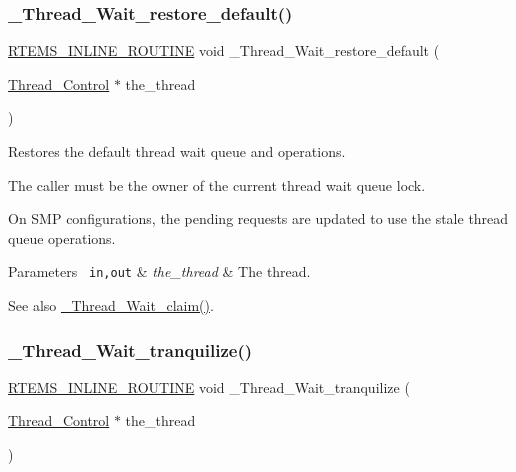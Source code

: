 \subsubsection{\texorpdfstring{\_Thread\_Wait\_restore\_default()}{\_Thread\_Wait\_restore\_default()}}
{\footnotesize\ttfamily \mbox{\hyperlink{group__RTEMSScoreBaseDefs_gac216239df231d5dbd15e3520b0b9313f}{R\+T\+E\+M\+S\+\_\+\+I\+N\+L\+I\+N\+E\+\_\+\+R\+O\+U\+T\+I\+NE}} void \+\_\+\+Thread\+\_\+\+Wait\+\_\+restore\+\_\+default (\begin{DoxyParamCaption}\item[{\mbox{\hyperlink{struct__Thread__Control}{Thread\+\_\+\+Control}} $\ast$}]{the\+\_\+thread }\end{DoxyParamCaption})}



Restores the default thread wait queue and operations. 

The caller must be the owner of the current thread wait queue lock.

On S\+MP configurations, the pending requests are updated to use the stale thread queue operations.


\begin{DoxyParams}[1]{Parameters}
\mbox{\texttt{ in,out}}  & {\em the\+\_\+thread} & The thread.\\
\hline
\end{DoxyParams}
\begin{DoxySeeAlso}{See also}
\mbox{\hyperlink{group__RTEMSScoreThread_ga032320598e809cb93d80e985906fb393}{\+\_\+\+Thread\+\_\+\+Wait\+\_\+claim()}}. 
\end{DoxySeeAlso}
\mbox{\label{group__RTEMSScoreThread_ga76f9b42638ae02922aa0a94a806f46a9}} 
\subsubsection{\texorpdfstring{\_Thread\_Wait\_tranquilize()}{\_Thread\_Wait\_tranquilize()}}
{\footnotesize\ttfamily \mbox{\hyperlink{group__RTEMSScoreBaseDefs_gac216239df231d5dbd15e3520b0b9313f}{R\+T\+E\+M\+S\+\_\+\+I\+N\+L\+I\+N\+E\+\_\+\+R\+O\+U\+T\+I\+NE}} void \+\_\+\+Thread\+\_\+\+Wait\+\_\+tranquilize (\begin{DoxyParamCaption}\item[{\mbox{\hyperlink{struct__Thread__Control}{Thread\+\_\+\+Control}} $\ast$}]{the\+\_\+thread }\end{DoxyParamCaption})}



